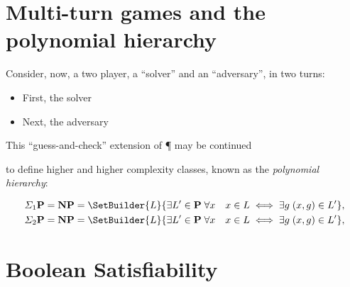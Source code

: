 
\section{Multi-turn games and the polynomial hierarchy}

Consider, now, a two player, a ``solver'' and an
``adversary'', in two turns:
\begin{itemize}
  \item First, the solver
  \item Next, the adversary
\end{itemize}

This ``guess-and-check'' extension of \P{} may be continued

to define higher
and higher complexity classes, known as the \emph{polynomial hierarchy}:
\begin{definition}
  \begin{align*}
    \SigmaP1 &= \NP = \SetBuilder{L}{\exists L' \in \P \; \forall x \quad
      x \in L \iff \exists g \; (x, g) \in L'
    }, \\
    \SigmaP2 &= \NP = \SetBuilder{L}{\exists L' \in \P \; \forall x \quad
      x \in L \iff \exists g \; (x, g) \in L'
    }, \\
  \end{align*}
\end{definition}




%








\section{Boolean Satisfiability}

